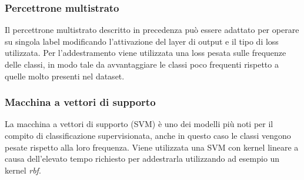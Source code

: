 \documentclass[technote]{IEEEtran}
\begin{document}
\subsubsection{Percettrone multistrato}
Il percettrone multistrato descritto in precedenza può essere adattato per operare su singola label modificando l'attivazione del layer di output e il tipo di loss utilizzata.
Per l'addestramento viene utilizzata una loss pesata sulle frequenze delle classi, in modo tale da avvantaggiare le classi poco frequenti rispetto a quelle molto presenti nel dataset.
\subsubsection{Macchina a vettori di supporto}
La macchina a vettori di supporto (SVM) è uno dei modelli più noti per il compito di classificazione supervisionata, anche in questo caso le classi vengono pesate rispetto alla loro frequenza. Viene utilizzata una SVM con kernel lineare a causa dell'elevato tempo richiesto per addestrarla utilizzando ad esempio un kernel \textit{rbf}.
\end{document}
